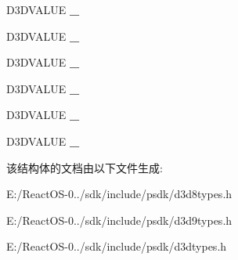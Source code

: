 \begin{DoxyCompactItemize}
D3\+D\+V\+A\+L\+UE {\bfseries \+\_}
\item 
\mbox{\label{struct___d3_d_m_a_t_r_i_x_a9ee21bd11b50263c79c7ad7b5b905774}} 
D3\+D\+V\+A\+L\+UE {\bfseries \+\_}
\item 
\mbox{\label{struct___d3_d_m_a_t_r_i_x_ad4263362e53d52222669d919f049c5d6}} 
D3\+D\+V\+A\+L\+UE {\bfseries \+\_}
\item 
\mbox{\label{struct___d3_d_m_a_t_r_i_x_a4a61b9a0bc3d9eac82f05e09c2c03787}} 
D3\+D\+V\+A\+L\+UE {\bfseries \+\_}
\item 
\mbox{\label{struct___d3_d_m_a_t_r_i_x_a9f7c0a0a80c0f313f5983e8fa76e0ee4}} 
D3\+D\+V\+A\+L\+UE {\bfseries \+\_}
\item 
\mbox{\label{struct___d3_d_m_a_t_r_i_x_a40a74f8e63c59a978f04a415e9ef38bc}} 
D3\+D\+V\+A\+L\+UE {\bfseries \+\_}
\end{DoxyCompactItemize}


该结构体的文档由以下文件生成\+:\begin{DoxyCompactItemize}
\item 
E\+:/\+React\+O\+S-\/0../sdk/include/psdk/d3d8types.\+h\item 
E\+:/\+React\+O\+S-\/0../sdk/include/psdk/d3d9types.\+h\item 
E\+:/\+React\+O\+S-\/0../sdk/include/psdk/d3dtypes.\+h\end{DoxyCompactItemize}
